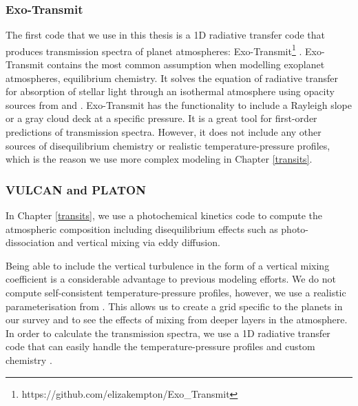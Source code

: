 
\subsubsection{Exo-Transmit}

The first code that we use in this thesis is a 1D radiative transfer code that produces transmission spectra of planet atmospheres: Exo-Transmit\footnote{https://github.com/elizakempton/Exo\_Transmit} \citep{Kempton2017a}. Exo-Transmit contains the most common assumption when modelling exoplanet atmospheres, equilibrium chemistry. It solves the equation of radiative transfer for absorption of stellar light through an isothermal atmosphere using opacity sources from \citet{Freedman2008} and \citet{Lupu2014}. Exo-Transmit has the functionality to include a Rayleigh slope or a gray cloud deck at a specific pressure. It is a great tool for first-order predictions of transmission spectra. However, it does not include any other sources of disequilibrium chemistry or realistic temperature-pressure profiles, which is the reason we use more complex modeling in Chapter \ref{transits}.

\subsubsection{VULCAN and PLATON}

In Chapter \ref{transits}, we use a photochemical kinetics code \citep[VULCAN\footnote{https://github.com/exoclime/VULCAN};][]{Tsai2017} to compute the atmospheric composition including disequilibrium effects such as photo-dissociation and vertical mixing via eddy diffusion.

Being able to include the vertical turbulence in the form of a vertical mixing coefficient is a considerable advantage to previous modeling efforts. We do not compute self-consistent temperature-pressure profiles, however, we use a realistic parameterisation from \citet{Heng2014}. This allows us to create a grid specific to the planets in our survey and to see the effects of mixing from deeper layers in the atmosphere. In order to calculate the transmission spectra, we use a 1D radiative transfer code that can easily handle the temperature-pressure profiles and custom chemistry \citep[PLATON\footnote{https://github.com/ideasrule/platon};][]{Zhang2019}.

